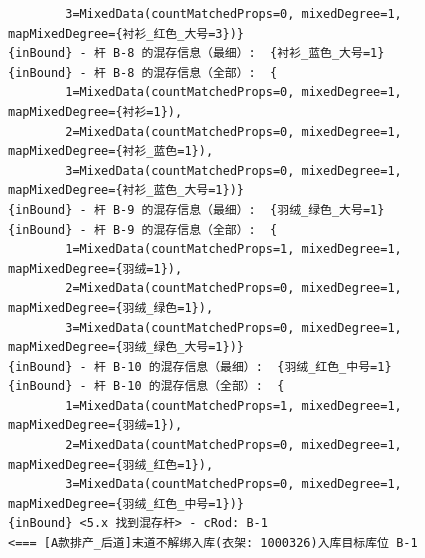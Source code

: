 {\begin{verbatim}
		3=MixedData(countMatchedProps=0, mixedDegree=1, mapMixedDegree={衬衫_红色_大号=3})}
{inBound} - 杆 B-8 的混存信息（最细）:  {衬衫_蓝色_大号=1}
{inBound} - 杆 B-8 的混存信息（全部）:  {
		1=MixedData(countMatchedProps=0, mixedDegree=1, mapMixedDegree={衬衫=1}), 
		2=MixedData(countMatchedProps=0, mixedDegree=1, mapMixedDegree={衬衫_蓝色=1}), 
		3=MixedData(countMatchedProps=0, mixedDegree=1, mapMixedDegree={衬衫_蓝色_大号=1})}
{inBound} - 杆 B-9 的混存信息（最细）:  {羽绒_绿色_大号=1}
{inBound} - 杆 B-9 的混存信息（全部）:  {
		1=MixedData(countMatchedProps=1, mixedDegree=1, mapMixedDegree={羽绒=1}), 
		2=MixedData(countMatchedProps=0, mixedDegree=1, mapMixedDegree={羽绒_绿色=1}), 
		3=MixedData(countMatchedProps=0, mixedDegree=1, mapMixedDegree={羽绒_绿色_大号=1})}
{inBound} - 杆 B-10 的混存信息（最细）:  {羽绒_红色_中号=1}
{inBound} - 杆 B-10 的混存信息（全部）:  {
		1=MixedData(countMatchedProps=1, mixedDegree=1, mapMixedDegree={羽绒=1}), 
		2=MixedData(countMatchedProps=0, mixedDegree=1, mapMixedDegree={羽绒_红色=1}), 
		3=MixedData(countMatchedProps=0, mixedDegree=1, mapMixedDegree={羽绒_红色_中号=1})}
{inBound} <5.x 找到混存杆> - cRod: B-1
<=== [A款排产_后道]末道不解绑入库(衣架: 1000326)入库目标库位 B-1


\end{verbatim}}
